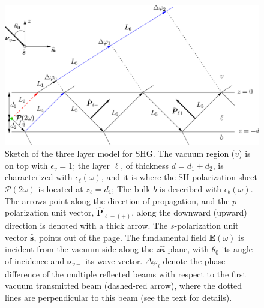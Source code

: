 \begin{figure}
\centering 
\includegraphics[scale=0.5]{content/figures/diag-3layer_MR_2w}
\caption{Sketch of the three layer model for SHG. The vacuum region ($v$) is on
top with $\epsilon_{v}=1$; the layer $\ell$, of thickness $d = d_{1} + d_{2}$,
is characterized with $\epsilon_{\ell}(\omega)$, and it is where the SH
polarization sheet $\boldsymbol{\mathcal{P}}(2\omega)$ is located at $z_{\ell} =
d_{1}$; The bulk $b$ is described with $\epsilon_{b}(\omega)$. The arrows point
along the direction of propagation, and the $p$-polarization unit vector,
$\hat{\mathbf{P}}_{\ell -(+)}$, along the downward (upward) direction is denoted
with a thick arrow. The $s$-polarization unit vector $\hat{\mathbf{s}}$, points
out of the page. The fundamental field $\mathbf{E}(\omega)$ is incident from the
vacuum side along the $z\hat{\boldsymbol{\kappa}}$-plane, with $\theta_{0}$ its
angle of incidence and $\boldsymbol{\nu}_{v-}$ its wave vector.
$\Delta\varphi_{i}$ denote the phase difference of the multiple reflected beams
with respect to the first vacuum transmitted beam (dashed-red arrow), where the
dotted lines are perpendicular to this beam (see the text for details).}
\label{fig:MR3layer2w}
\end{figure}

